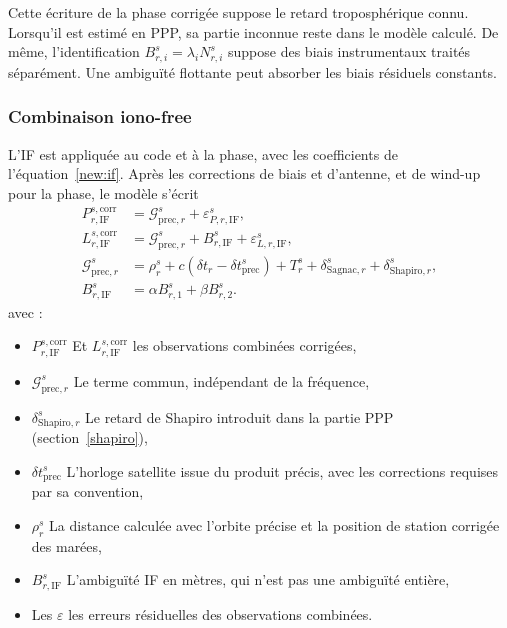Cette écriture de la phase corrigée suppose le retard troposphérique connu.
Lorsqu'il est estimé en PPP, sa partie inconnue reste dans le modèle calculé.
De même, l'identification $B_{r,i}^s=\lambda_iN_{r,i}^s$ suppose des biais
instrumentaux traités séparément. Une ambiguïté flottante peut absorber
les biais résiduels constants.

\subsubsection{Combinaison iono-free}

L'IF est appliquée au code et à la phase, avec les coefficients de
l'équation~\eqref{new:if}. Après les corrections de biais et d'antenne, et de
wind-up pour la phase, le modèle s'écrit
\begin{align}
P_{r,\mathrm{IF}}^{s,\mathrm{corr}}&=
\mathcal G_{\mathrm{prec},r}^s+\varepsilon_{P,r,\mathrm{IF}}^s,\\
L_{r,\mathrm{IF}}^{s,\mathrm{corr}}&=
\mathcal G_{\mathrm{prec},r}^s+B_{r,\mathrm{IF}}^s+\varepsilon_{L,r,\mathrm{IF}}^s,\\
\mathcal G_{\mathrm{prec},r}^s&=\rho_r^s+c(\delta t_r-\delta t_{\mathrm{prec}}^s)
+T_r^s+\delta_{\mathrm{Sagnac},r}^s+\delta_{\mathrm{Shapiro},r}^s,\\
B_{r,\mathrm{IF}}^s&=\alpha B_{r,1}^s+\beta B_{r,2}^s.
\label{new:ppp_model}
\end{align}
avec :
\begin{itemize}
\item $P_{r,\mathrm{IF}}^{s,\mathrm{corr}}$ Et
$L_{r,\mathrm{IF}}^{s,\mathrm{corr}}$ les observations combinées corrigées,
\item $\mathcal G_{\mathrm{prec},r}^s$ Le terme commun, indépendant de la fréquence,
\item $\delta_{\mathrm{Shapiro},r}^s$ Le retard de Shapiro introduit dans
la partie PPP (section~\ref{shapiro}),
\item $\delta t_{\mathrm{prec}}^s$ L'horloge satellite issue du produit précis,
avec les corrections requises par sa convention,
\item $\rho_r^s$ La distance calculée avec l'orbite précise et la position de
station corrigée des marées,
\item $B_{r,\mathrm{IF}}^s$ L'ambiguïté IF en mètres, qui n'est pas
une ambiguïté entière,
\item Les $\varepsilon$ les erreurs résiduelles des observations combinées.
\end{itemize}

